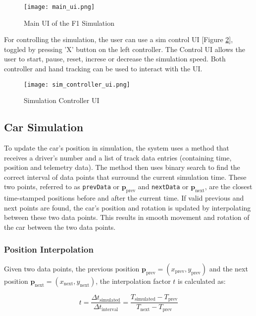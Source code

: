 \documentclass[
	a4paper, %
	10pt, %
	unnumberedsections, %
	twoside, %
]{LTJournalArticle}
\begin{document}
\begin{figure}[h] %
	\texttt{[image: main\_ui.png]}
	\caption{Main UI of the F1 Simulation}
    \label{fig:main_ui_unity}
\end{figure}

For controlling the simulation, the user can use a sim control UI [Figure \ref{fig:sim_controller_ui}], toggled by pressing 'X' button on the left controller.
The Control UI allows the user to start, pause, reset, increse or decrease the simulation speed. Both controller and hand tracking can be used to interact with the UI.

\begin{figure}[h] %
	\texttt{[image: sim\_controller\_ui.png]}
	\caption{Simulation Controller UI}
    \label{fig:sim_controller_ui}
\end{figure}

\subsection{Car Simulation}

To update the car's position in simulation, the system uses a method that receives a driver's number and a list of track data entries (containing time, position and telemetry data). 
The method then uses binary search to find the correct interval of data points that surround the current simulation time. These two points, referred to as \verb|prevData| or $\mathbf{p}_{\text{prev}}$ 
and \verb|nextData| or $\mathbf{p}_{\text{next}}$, are the closest time-stamped positions before and after the current time. If valid previous and next points are found, the car's position and rotation is updated by interpolating between these two data points. This results in smooth movement and rotation of the car between the two data points.

\subsubsection{Position Interpolation}
Given two data points, the previous position $\mathbf{p}_{\text{prev}} = (x_{\text{prev}}, y_{\text{prev}})$ and the next position $\mathbf{p}_{\text{next}} = (x_{\text{next}}, y_{\text{next}})$, 
the interpolation factor $t$ is calculated as:

\[
t = \frac{\Delta t_{\text{simulated}}}{\Delta t_{\text{interval}}} = \frac{T_{\text{simulated}} - T_{\text{prev}}}{T_{\text{next}} - T_{\text{prev}}}
\]
\end{document}
